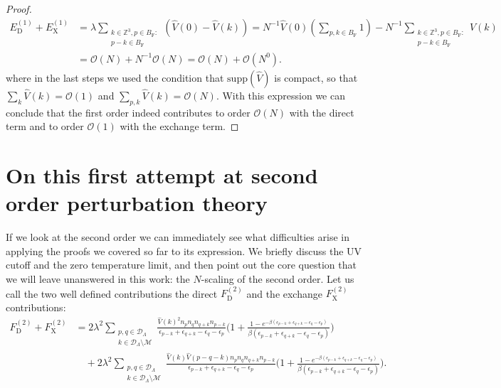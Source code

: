\begin{proof}
\begin{align*}
		E_{\mathrm{D}}^{(1)}+E_{\mathrm{X}}^{(1)}
		&= \lambda\sum_{\substack{k\in\mathbb{Z}^3,p\in B_{\mathrm{F}}:\\p-k\in B_{\mathrm{F}}}}\left(\hat{V}(0)-\hat{V}(k)\right)
		= N^{-1}\hat{V}(0)\left(\sum_{p,k\in B_{\mathrm{F}}}1\right)
		- N^{-1}\sum_{\substack{k\in\mathbb{Z}^3,p\in B_{\mathrm{F}}:\\p-k\in B_{\mathrm{F}}}}\hat{V}(k)\\
		&= \mathcal{O}(N) + N^{-1}\mathcal{O}(N) = \mathcal{O}(N) + \mathcal{O}(N^0).
	\end{align*}
	where in the last steps we used the condition that $\mathrm{supp}(\hat{V})$ is compact, so
	that $\sum_k\hat{V}(k)=\mathcal{O}(1)$ and $\sum_{p,k}\hat{V}(k)=\mathcal{O}(N)$. With
	this expression we can conclude that the first order indeed contributes to order
	$\mathcal{O}(N)$ with the direct term and to order $\mathcal{O}(1)$ with the exchange term.
\end{proof}

\section{On this first attempt at second order perturbation theory}

If we look at the second order we can immediately see what difficulties arise in applying the
proofs we covered so far to its expression.
We briefly discuss the UV cutoff and the zero temperature limit, and then point out the core
question that we will leave unanswered in this work: the $N$-scaling of the second order.
Let us call the two well defined contributions the direct $F^{(2)}_{\mathrm{D}}$ and the
exchange $F^{(2)}_{\mathrm{X}}$ contributions:
\begin{align}
	\label{bad-second-order}
	F^{(2)}_{\mathrm{D}} + F^{(2)}_{\mathrm{X}}
	&= 2\lambda^2\sum_{\substack{p,q\in\mathcal{D}_\Lambda\\k\in\mathcal{D}_\Lambda\setminus\mathcal{M}}}
	\frac{\hat{V}(k)^2 n_p n_q n_{q+k} n_{p-k}}{\epsilon_{p-k}+\epsilon_{q+k}-\epsilon_q-\epsilon_p}
	\biggl(1 + \frac{1-e^{-\beta(\epsilon_{p-k}+\epsilon_{q+k}-\epsilon_q-\epsilon_p)}}{\beta(\epsilon_{p-k}+\epsilon_{q+k}-\epsilon_q-\epsilon_p)} \biggr)\nonumber\\
	&\quad+ 2\lambda^2\sum_{\substack{p,q\in\mathcal{D}_\Lambda\\k\in\mathcal{D}_\Lambda\setminus\mathcal{M}}}
	\frac{\hat{V}(k)\hat{V}(p-q-k) n_p n_q n_{q+k} n_{p-k}}{\epsilon_{p-k}+\epsilon_{q+k}-\epsilon_q-\epsilon_p}
	\biggl(1 + \frac{1-e^{-\beta(\epsilon_{p-k}+\epsilon_{q+k}-\epsilon_q-\epsilon_p)}}{\beta(\epsilon_{p-k}+\epsilon_{q+k}-\epsilon_q-\epsilon_p)} \biggr).
\end{align}

